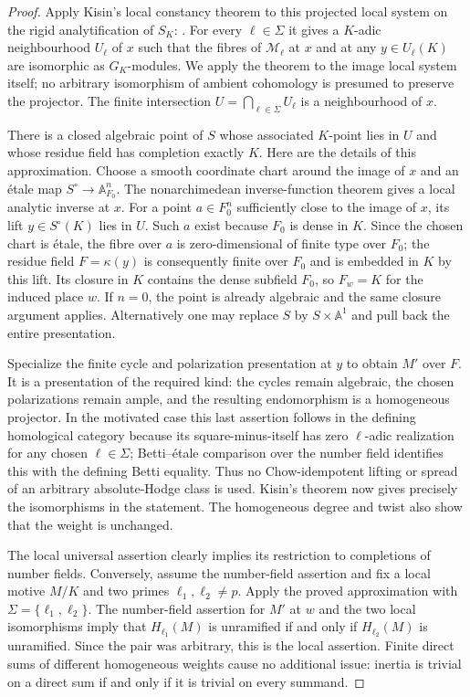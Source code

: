 \begin{proof}
Apply Kisin's local constancy theorem to this projected local
system on the rigid analytification of $S_K$:
\citet[Theorem~5.1, author p.~16; Proposition~5.2(2) and proof,
author pp.~17--18]{c_kisin1999localconstancy}.
For every $\ell\in\Sigma$ it gives a $K$-adic neighbourhood
$U_\ell$ of $x$ such that the fibres of $\mathcal M_\ell$ at
$x$ and at any $y\in U_\ell(K)$ are isomorphic as $G_K$-modules.
We apply the theorem to the image local system itself; no
arbitrary isomorphism of ambient cohomology is presumed to
preserve the projector.
The finite intersection $U=\bigcap_{\ell\in\Sigma}U_\ell$
is a neighbourhood of $x$.

There is a closed algebraic point of $S$ whose associated
$K$-point lies in $U$ and whose residue field has completion
exactly $K$. Here are the details of this approximation.
Choose a smooth coordinate chart around the image of $x$ and
an \'etale map $S^\circ\to\mathbb A^n_{F_0}$.
The nonarchimedean inverse-function theorem gives a local
analytic inverse at $x$. For a point
$a\in F_0^n$ sufficiently close to the image of $x$, its lift
$y\in S^\circ(K)$ lies in $U$.
Such $a$ exist because $F_0$ is dense in $K$.
Since the chosen chart is \'etale, the fibre over $a$ is
zero-dimensional of finite type over $F_0$; the residue field
$F=\kappa(y)$ is consequently finite over $F_0$ and is embedded
in $K$ by this lift. Its closure in $K$ contains the dense
subfield $F_0$, so $F_w=K$ for the induced place $w$.
If $n=0$, the point is already algebraic and the same closure
argument applies. Alternatively one may replace $S$ by
$S\times\mathbb A^1$ and pull back the entire presentation.

Specialize the finite cycle and polarization presentation at
$y$ to obtain $M'$ over $F$.
It is a presentation of the required kind: the cycles remain
algebraic, the chosen polarizations remain ample, and the
resulting endomorphism is a homogeneous projector. In the
motivated case this last assertion follows in the defining
homological category because its square-minus-itself has zero
$\ell$-adic realization for any chosen $\ell\in\Sigma$;
Betti--\'etale comparison over the number field identifies this
with the defining Betti equality. Thus no Chow-idempotent
lifting or spread of an arbitrary absolute-Hodge class is used.
Kisin's theorem now gives precisely the isomorphisms in the
statement. The homogeneous degree and twist also show that
the weight is unchanged.

The local universal assertion clearly implies its restriction
to completions of number fields.
Conversely, assume the number-field assertion and fix a local
motive $M/K$ and two primes $\ell_1,\ell_2\ne p$.
Apply the proved approximation with
$\Sigma=\{\ell_1,\ell_2\}$.
The number-field assertion for $M'$ at $w$ and the two local
isomorphisms imply that $H_{\ell_1}(M)$ is unramified if and
only if $H_{\ell_2}(M)$ is unramified.
Since the pair was arbitrary, this is the local assertion.
Finite direct sums of different homogeneous weights cause no
additional issue: inertia is trivial on a direct sum if and
only if it is trivial on every summand.
\end{proof}


